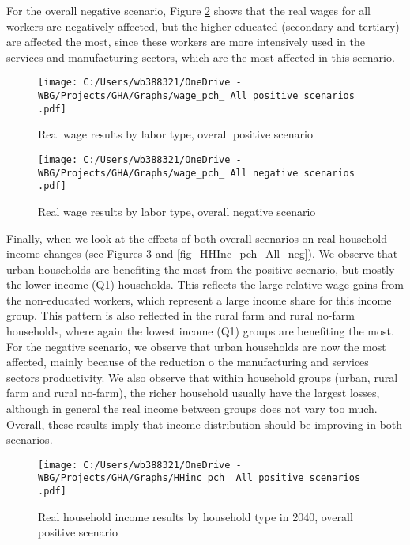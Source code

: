 \documentclass[11pt,english]{article}
\begin{document}
For the overall negative scenario, Figure \ref{fig_wage_pch_All_neg} shows that the real wages for all workers are negatively affected, but the higher educated (secondary and tertiary) are affected the most, since these workers are more intensively used in the services and manufacturing sectors, which are the most affected in this scenario. 

\begin{figure}[ht!]\caption{Real wage results by labor type, overall positive scenario}\label{fig_wage_pch_All_pos}
	\centering
	\texttt{[image: C:/Users/wb388321/OneDrive - WBG/Projects/GHA/Graphs/wage\_pch\_ All positive scenarios .pdf]}
\end{figure}

\begin{figure}[ht!]\caption{Real wage results by labor type, overall negative scenario} \label{fig_wage_pch_All_neg}
	\centering
	\texttt{[image: C:/Users/wb388321/OneDrive - WBG/Projects/GHA/Graphs/wage\_pch\_ All negative scenarios .pdf]}
\end{figure}

\clearpage

Finally, when we look at the effects of both overall scenarios on real household income changes (see Figures \ref{fig_HHInc_pch_All_pos} and \ref{fig_HHInc_pch_All_neg}). We observe that urban households are benefiting the most from the positive scenario, but mostly the lower income (Q1) households. This reflects the large relative wage gains from the non-educated workers, which represent a large income share for this income group. This pattern is also reflected in the rural farm and rural no-farm households, where again the lowest income (Q1) groups are benefiting the most. For the negative scenario, we observe that urban households are now the most affected, mainly because of the reduction o the manufacturing and services sectors productivity. We also observe that within household groups (urban, rural farm and rural no-farm), the richer household usually have the largest losses, although in general the real income between groups does not vary too much. Overall, these results imply that income distribution should be improving in both scenarios.

\begin{figure}[ht!]\caption{Real household income results by household type in 2040, overall positive scenario} \label{fig_HHInc_pch_All_pos}
	\centering
	\texttt{[image: C:/Users/wb388321/OneDrive - WBG/Projects/GHA/Graphs/HHinc\_pch\_ All positive scenarios .pdf]}
\end{figure}
\end{document}

